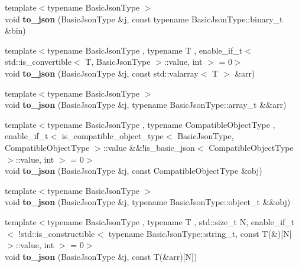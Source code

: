 \begin{DoxyCompactItemize}
\item 
\mbox{\label{namespacenlohmann_1_1detail_a22191081208b226e3875e1118107c281}} 
{\footnotesize template$<$typename Basic\+Json\+Type $>$ }\\void {\bfseries to\+\_\+json} (Basic\+Json\+Type \&j, const typename Basic\+Json\+Type\+::binary\+\_\+t \&bin)
\item 
\mbox{\label{namespacenlohmann_1_1detail_a7f7c7b9760161b774cdc0b4b838fae64}} 
{\footnotesize template$<$typename Basic\+Json\+Type , typename T , enable\+\_\+if\+\_\+t$<$ std\+::is\+\_\+convertible$<$ T, Basic\+Json\+Type $>$\+::value, int $>$  = 0$>$ }\\void {\bfseries to\+\_\+json} (Basic\+Json\+Type \&j, const std\+::valarray$<$ T $>$ \&arr)
\item 
\mbox{\label{namespacenlohmann_1_1detail_aa0fd1b5788e9ba37e31da43dda738cb5}} 
{\footnotesize template$<$typename Basic\+Json\+Type $>$ }\\void {\bfseries to\+\_\+json} (Basic\+Json\+Type \&j, typename Basic\+Json\+Type\+::array\+\_\+t \&\&arr)
\item 
\mbox{\label{namespacenlohmann_1_1detail_a24c9c12f3839c94e09532f08de85e949}} 
{\footnotesize template$<$typename Basic\+Json\+Type , typename Compatible\+Object\+Type , enable\+\_\+if\+\_\+t$<$ is\+\_\+compatible\+\_\+object\+\_\+type$<$ Basic\+Json\+Type, Compatible\+Object\+Type $>$\+::value \&\&!is\+\_\+basic\+\_\+json$<$ Compatible\+Object\+Type $>$\+::value, int $>$  = 0$>$ }\\void {\bfseries to\+\_\+json} (Basic\+Json\+Type \&j, const Compatible\+Object\+Type \&obj)
\item 
\mbox{\label{namespacenlohmann_1_1detail_ac9f7a5542851c61d93740148eaec509f}} 
{\footnotesize template$<$typename Basic\+Json\+Type $>$ }\\void {\bfseries to\+\_\+json} (Basic\+Json\+Type \&j, typename Basic\+Json\+Type\+::object\+\_\+t \&\&obj)
\item 
\mbox{\label{namespacenlohmann_1_1detail_a20ea5175c8999fc8b673e46b892f71f6}} 
{\footnotesize template$<$typename Basic\+Json\+Type , typename T , std\+::size\+\_\+t N, enable\+\_\+if\+\_\+t$<$ !std\+::is\+\_\+constructible$<$ typename Basic\+Json\+Type\+::string\+\_\+t, const T(\&)\mbox{[}\+N\mbox{]}$>$\+::value, int $>$  = 0$>$ }\\void {\bfseries to\+\_\+json} (Basic\+Json\+Type \&j, const T(\&arr)\mbox{[}N\mbox{]})

\end{DoxyCompactItemize}
